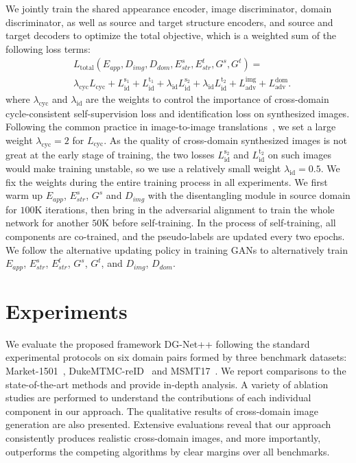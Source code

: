 \documentclass[runningheads]{llncs}
\begin{document}
We jointly train the shared appearance encoder, image discriminator, domain discriminator, as well as source and target structure encoders, and source and target decoders to optimize the total objective, which is a weighted sum of the following loss terms:
\begin{equation}
\begin{aligned}
&L_{\mathrm{total}}(E_{app}, D_{img}, D_{dom}, E_{str}^{s}, E_{str}^{t}, G^s, G^t) = \\
& \lambda_{\mathrm{cyc}} L_{\mathrm{cyc}} + L^{\mathrm{s_1}}_{\mathrm{id}} + L^{\mathrm{t_1}}_{\mathrm{id}} +\lambda_{\mathrm{id}} L^{\mathrm{s_2}}_{\mathrm{id}} +
\lambda_{\mathrm{id}} L^{\mathrm{t_2}}_{\mathrm{id}} +
L^{\mathrm{img}}_{\mathrm{adv}} + L^{\mathrm{dom}}_{\mathrm{adv}}.
\end{aligned}
\label{eq:total}
\end{equation}
\noindent where $\lambda_{\mathrm{cyc}}$ and $\lambda_{\mathrm{id}}$ are the weights to control the importance of cross-domain cycle-consistent self-supervision loss and identification loss on synthesized images. Following the common practice in image-to-image translations~\cite{Huang_2018_ECCV,lee2018diverse,zhu2017unpaired}, we set a large weight $\lambda_{\mathrm{cyc}} = 2$ for $L_{\mathrm{cyc}}$. As the quality of cross-domain synthesized images is not great at the early stage of training, the two losses $L^{\mathrm{s_2}}_{\mathrm{id}}$ and $L^{\mathrm{t_2}}_{\mathrm{id}}$ on such images would make training unstable, so we use a relatively small weight $\lambda_{\mathrm{id}} = 0.5$. We fix the weights during the entire training process in all experiments. We first warm up $E_{app}$, $E_{str}^s$, $G^s$ and $D_{img}$ with the disentangling module in source domain for $100$K iterations, then bring in the adversarial alignment to train the whole network for another $50$K before self-training. In the process of self-training, all components are co-trained, and the pseudo-labels are updated every two epochs. We follow the alternative updating policy in training GANs to alternatively train $E_{app}$, $E_{str}^s$, $E_{str}^t$, $G^s$, $G^t$, and $D_{img}$, $D_{dom}$.




\section{Experiments}
We evaluate the proposed framework DG-Net++ following the standard experimental protocols on six domain pairs formed by three benchmark datasets: Market-1501~\cite{zheng2015scalable}, DukeMTMC-reID~\cite{dukemtmc} and MSMT17~\cite{wei2018person}. We report comparisons to the state-of-the-art methods and provide in-depth analysis. A variety of ablation studies are performed to understand the contributions of each individual component in our approach. The qualitative results of cross-domain image generation are also presented. Extensive evaluations reveal that our approach consistently produces realistic cross-domain images, and more importantly, outperforms the competing algorithms by clear margins over all benchmarks.   
\end{document}
